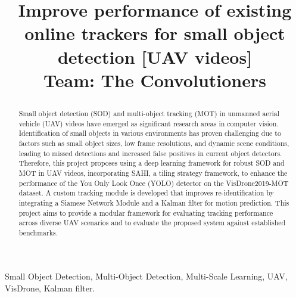 \documentclass[conference]{IEEEtran}
\title{Improve performance of existing online trackers for small object detection [UAV videos] \\
\textbf{\large Team: The Convolutioners}

}
\author{

\IEEEauthorblockN{Aagam Sheth}
\IEEEauthorblockA{
AU2544006\\
M.Tech (CSE)
}
\and
\IEEEauthorblockN{Mahima Parekh}
\IEEEauthorblockA{
AU2544003\\
M.Tech (CSE)
}
\and
\IEEEauthorblockN{Khevan Thanki}
\IEEEauthorblockA{
AU23L20002\\
BS (Hons) CS
}
\and
\IEEEauthorblockN{Riddhi Bhargava}
\IEEEauthorblockA{
AU22220028\\
BS (Hons) CS
}

}
\begin{document}
\maketitle

\begin{abstract}
Small object detection (SOD) and multi-object tracking (MOT) in unmanned aerial vehicle (UAV) videos have emerged as significant research areas in computer vision. Identification of small objects in various environments has proven challenging due to factors such as small object sizes, low frame resolutions, and dynamic scene conditions, leading to missed detections and increased false positives in current object detectors. Therefore, this project proposes using a deep learning framework for robust SOD and MOT in UAV videos, incorporating SAHI, a tiling strategy framework, to enhance the performance of the You Only Look Once (YOLO) detector on the VisDrone2019-MOT dataset. A custom tracking module is developed that improves re-identification by integrating a Siamese Network Module and a Kalman filter for motion prediction. This project aims to provide a modular framework for evaluating tracking performance across diverse UAV scenarios and to evaluate the proposed system against established benchmarks.
\end{abstract}

\begin{IEEEkeywords}
Small Object Detection, Multi-Object Detection, Multi-Scale Learning, UAV, VisDrone, Kalman filter.
\end{IEEEkeywords}

\end{document}
